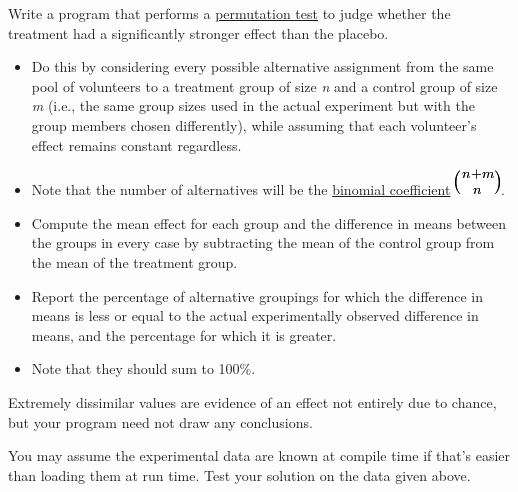 Write a program that performs a
\href{http://en.wikipedia.org/wiki/Permutation\_test\#Permutation\_tests}{permutation
test} to judge whether the treatment had a significantly stronger effect
than the placebo.

\begin{itemize}
\item
  Do this by considering every possible alternative assignment from the
  same pool of volunteers to a treatment group of size \emph{n} and a
  control group of size \emph{m} (i.e., the same group sizes used in the
  actual experiment but with the group members chosen differently),
  while assuming that each volunteer's effect remains constant
  regardless.
\item
  Note that the number of alternatives will be the
  \href{http://en.wikipedia.org/wiki/Binomial\_coefficient}{binomial
  coefficient}
  \includegraphics[scale=.6]{graphics/7f019c11129cbf4b99ccb7f7e110acb2.png}.
\item
  Compute the mean effect for each group and the difference in means
  between the groups in every case by subtracting the mean of the
  control group from the mean of the treatment group.
\item
  Report the percentage of alternative groupings for which the
  difference in means is less or equal to the actual experimentally
  observed difference in means, and the percentage for which it is
  greater.
\item
  Note that they should sum to 100\%.
\end{itemize}

Extremely dissimilar values are evidence of an effect not entirely due
to chance, but your program need not draw any conclusions.

You may assume the experimental data are known at compile time if that's
easier than loading them at run time. Test your solution on the data
given above.




